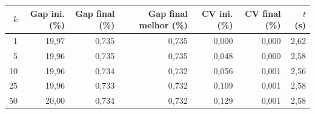 \begin{tabular}{rrrrrrr}
\hline
$k$ & Gap ini. (\%) & Gap final (\%) & Gap final melhor (\%) & CV ini. (\%) & CV final (\%) & $t$ (s) \\
\hline
1 & 19,97 & 0,735 & 0,735 & 0,000 & 0,000 & 2,62 \\
5 & 19,96 & 0,735 & 0,735 & 0,048 & 0,000 & 2,58 \\
10 & 19,96 & 0,734 & 0,732 & 0,056 & 0,001 & 2,56 \\
25 & 19,96 & 0,733 & 0,732 & 0,109 & 0,001 & 2,58 \\
50 & 20,00 & 0,734 & 0,732 & 0,129 & 0,001 & 2,58 \\
\hline
\end{tabular}
